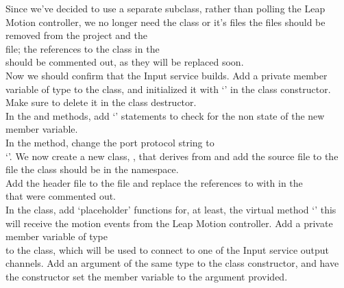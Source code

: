 Since we've decided to use a separate  subclass, rather than
polling the Leap Motion controller, we no longer need the 
class or it's files \longDash{} the files should be removed from the project and the\\
 file; the references to the
 class in the\\
 should be commented out, as they will be replaced soon.\\

Now we should confirm that the Input service builds.
\tertiaryEnd{}
Add a private member variable of type  to the
 class, and initialized it with
`' in the class constructor.
Make sure to delete it in the class destructor.\\

In the  and
 methods, add `' statements to
check for the non\longDash{} state of the new member variable.\\

In the  method, change the
port protocol string to\\
`'.
\tertiaryEnd{}
We now create a new  class, , that derives
from  and add the source file to the
 file \longDash{} the class should be in the
 namespace.\\

Add the header file  to the file
 and replace the references to
 with  in the\\
 that were commented out.\\

In the  class, add `placeholder' functions for, at least,
the virtual method `' \longDash{} this will receive the motion events from
the Leap Motion controller.
Add a private member variable of type\\
 to the class, which will be used to connect to one of
the Input service output channels.
Add an argument of the same type to the class constructor, and have the constructor set
the member variable to the argument provided.\\


